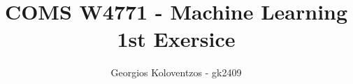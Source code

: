 \documentclass[letterpaper,single,9pt]{article}
\begin{document}
\title{COMS W4771 - Machine Learning 1st Exersice}

  \author{ {\rm Georgios Koloventzos - gk2409} \\ }

\maketitle


%
%
%
\end{document}

